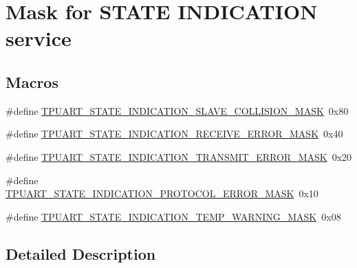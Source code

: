 \hypertarget{group___u_a_r_t___control___mask}{}\section{Mask for S\+T\+A\+TE I\+N\+D\+I\+C\+A\+T\+I\+ON service}
\label{group___u_a_r_t___control___mask}
\subsection*{Macros}
\begin{DoxyCompactItemize}
\item 
\#define \hyperlink{group___u_a_r_t___control___mask_gaa3b1b3fcea0f2c6958b8c2ad18b2ff44}{T\+P\+U\+A\+R\+T\+\_\+\+S\+T\+A\+T\+E\+\_\+\+I\+N\+D\+I\+C\+A\+T\+I\+O\+N\+\_\+\+S\+L\+A\+V\+E\+\_\+\+C\+O\+L\+L\+I\+S\+I\+O\+N\+\_\+\+M\+A\+SK}~0x80
\item 
\#define \hyperlink{group___u_a_r_t___control___mask_ga9c802952604ff15912e64b3c05d60931}{T\+P\+U\+A\+R\+T\+\_\+\+S\+T\+A\+T\+E\+\_\+\+I\+N\+D\+I\+C\+A\+T\+I\+O\+N\+\_\+\+R\+E\+C\+E\+I\+V\+E\+\_\+\+E\+R\+R\+O\+R\+\_\+\+M\+A\+SK}~0x40
\item 
\#define \hyperlink{group___u_a_r_t___control___mask_ga3f256ea6d3f1ad0cb867c19fc5a9171c}{T\+P\+U\+A\+R\+T\+\_\+\+S\+T\+A\+T\+E\+\_\+\+I\+N\+D\+I\+C\+A\+T\+I\+O\+N\+\_\+\+T\+R\+A\+N\+S\+M\+I\+T\+\_\+\+E\+R\+R\+O\+R\+\_\+\+M\+A\+SK}~0x20
\item 
\#define \hyperlink{group___u_a_r_t___control___mask_ga68aff090513ca8e64a9686c71d232913}{T\+P\+U\+A\+R\+T\+\_\+\+S\+T\+A\+T\+E\+\_\+\+I\+N\+D\+I\+C\+A\+T\+I\+O\+N\+\_\+\+P\+R\+O\+T\+O\+C\+O\+L\+\_\+\+E\+R\+R\+O\+R\+\_\+\+M\+A\+SK}~0x10
\item 
\#define \hyperlink{group___u_a_r_t___control___mask_ga08fadbb4584563c93631852bd718f1e2}{T\+P\+U\+A\+R\+T\+\_\+\+S\+T\+A\+T\+E\+\_\+\+I\+N\+D\+I\+C\+A\+T\+I\+O\+N\+\_\+\+T\+E\+M\+P\+\_\+\+W\+A\+R\+N\+I\+N\+G\+\_\+\+M\+A\+SK}~0x08
\end{DoxyCompactItemize}


\subsection{Detailed Description}


